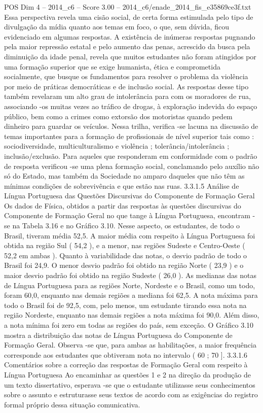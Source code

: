 \begin{textsample}{POS Dim 4 – 2014\_c6 – Score 3.00 – 2014\_c6/enade\_2014\_fis\_e35869ce3f.txt}
Essa perspectiva revela uma cisão social, de certa forma estimulada pelo tipo de divulgação da mídia quanto aos temas em foco, o que, sem dúvida, ficou evidenciado em algumas respostas.
A existência de inúmeras respostas pugnando pela maior repressão estatal e pelo aumento das penas, acrescido da busca pela diminuição da idade penal, revela que muitos estudantes não foram atingidos por uma formação superior que se exige humanista, ética e comprometida socialmente, que busque os fundamentos para resolver o problema da violência por meio de práticas democráticas e de inclusão social.
As respostas desse tipo também revelaram um alto grau de intolerância para com os moradores de rua, associando -os muitas vezes ao tráfico de drogas, à exploração indevida do espaço público, bem como a crimes como extorsão dos motoristas quando pedem dinheiro para guardar os veículos.
Nessa trilha, verifica -se lacuna na discussão de temas importantes para a formação de profissionais de nível superior tais como : sociodiversidade, multiculturalismo e violência ; tolerância/intolerância ; inclusão/exclusão.
Para aqueles que responderam em conformidade com o padrão de resposta verificou -se uma plena formação social, conclamando pelo auxílio não só do Estado, mas também da Sociedade no amparo daqueles que não têm as mínimas condições de sobrevivência e que estão nas ruas. 3.3.1.5 Análise de Língua Portuguesa das Questões Discursivas do Componente de Formação Geral Os dados de Física, obtidos a partir das respostas às questões discursivas do Componente de Formação Geral no que tange à Língua Portuguesa, encontram -se na Tabela 3.16 e no Gráfico 3.10.
Nesse aspecto, os estudantes, de todo o Brasil, tiveram média 52,5.
A maior média com respeito à Língua Portuguesa foi obtida na região Sul ( 54,2 ), e a menor, nas regiões Sudeste e Centro-Oeste ( 52,2 em ambas ).
Quanto à variabilidade das notas, o desvio padrão de todo o Brasil foi 24,9.
O menor desvio padrão foi obtido na região Norte ( 23,9 ) e o maior desvio padrão foi obtido na região Sudeste ( 26,0 ).
As medianas das notas de Língua Portuguesa para as regiões Norte, Nordeste e o Brasil, como um todo, foram 60,0, enquanto nas demais regiões a mediana foi 62,5.
A nota máxima para todo o Brasil foi de 92,5, com, pelo menos, um estudante tirando essa nota na região Nordeste, enquanto nas demais regiões a nota máxima foi 90,0.
Além disso, a nota mínima foi zero em todas as regiões do país, sem exceção.
O Gráfico 3.10 mostra a distribuição das notas de Língua Portuguesa do Componente de Formação Geral.
Observa -se que, para ambas as habilitações, a maior frequência corresponde aos estudantes que obtiveram nota no intervalo ( 60 ; 70 ]. 3.3.1.6 Comentários sobre a correção das respostas de Formação Geral com respeito à Língua Portuguesa Ao encaminhar as questões 1 e 2 na direção da produção de um texto dissertativo, esperava -se que o estudante utilizasse seus conhecimentos sobre o assunto e estruturasse seus textos de acordo com as exigências do registro formal próprio dessa situação comunicativa.

\end{textsample}
